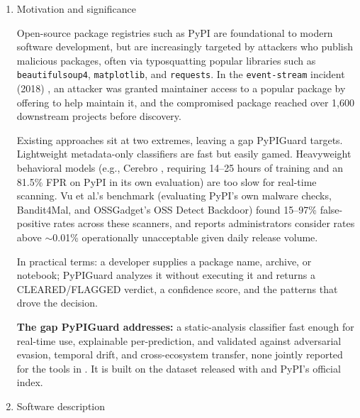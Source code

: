 \documentclass[preprint,12pt, a4paper]{elsarticle}
\begin{document}
\begin{enumerate}

\item Motivation and significance

Open-source package registries such as PyPI are foundational to modern software development, but are increasingly targeted by attackers who publish malicious packages, often via typosquatting popular libraries such as \texttt{beautifulsoup4}, \texttt{matplotlib}, and \texttt{requests}. In the \texttt{event-stream} incident (2018) \cite{backstabber}, an attacker was granted maintainer access to a popular package by offering to help maintain it, and the compromised package reached over 1,600 downstream projects before discovery.

Existing approaches sit at two extremes, leaving a gap PyPIGuard targets. Lightweight metadata-only classifiers are fast but easily gamed. Heavyweight behavioral models (e.g., Cerebro \cite{cerebro}, requiring 14--25 hours of training and an 81.5\% FPR on PyPI in its own evaluation) are too slow for real-time scanning. Vu et al.'s benchmark \cite{vu2022} (evaluating PyPI's own malware checks, Bandit4Mal, and OSSGadget's OSS Detect Backdoor) found 15--97\% false-positive rates across these scanners, and reports administrators consider rates above $\sim$0.01\% operationally unacceptable given daily release volume.

In practical terms: a developer supplies a package name, archive, or notebook; PyPIGuard analyzes it without executing it and returns a CLEARED/FLAGGED verdict, a confidence score, and the patterns that drove the decision.

\textbf{The gap PyPIGuard addresses:} a static-analysis classifier fast enough for real-time use, explainable per-prediction, and validated against adversarial evasion, temporal drift, and cross-ecosystem transfer, none jointly reported for the tools in \cite{vu2022}. It is built on the dataset released with \cite{malregistry} and PyPI's official index.

\item Software description


\end{enumerate}
\end{document}
